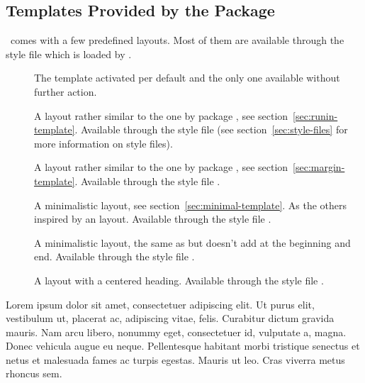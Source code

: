 \documentclass{xsim-manual}
\begin{document}
\subsection{Templates Provided by the Package}
\xsim\ comes with a few predefined layouts.  Most of them are available
through the style file  which is loaded by
.
\begin{description}
  \item[] The template activated per default and the only one
    available without further action.
  \item[] A layout rather similar to the one by package
    , see section~\vref{sec:runin-template}.  Available through
    the style file  (see section~\vref{sec:style-files} for more
    information on style files).
  \item[] A layout rather similar to the one by package
    , see section~\ref{sec:margin-template}.  Available through
    the style file .
  \item[] A minimalistic layout, see
    section~\ref{sec:minimal-template}.  As the others inspired by an
     layout. Available through the style file .
  \item[] A minimalistic layout, the same as
     but doesn't add  at the beginning and end.
    Available through the style file .
  \item[] A layout with a centered heading.
    Available through the style file .
\end{description}

\begin{exercise}[subtitle=The Subtitle,points=2.5,ID=showlayout]
  Lorem ipsum dolor sit amet, consectetuer adipiscing elit. Ut purus elit,
  vestibulum ut, placerat ac, adipiscing vitae, felis. Curabitur dictum
  gravida mauris. Nam arcu libero, nonummy eget, consectetuer id, vulputate a,
  magna. Donec vehicula augue eu neque. Pellentesque habitant morbi tristique
  senectus et netus et malesuada fames ac turpis egestas. Mauris ut leo. Cras
  viverra metus rhoncus sem.
\end{exercise}

\listlayouts
\end{document}

